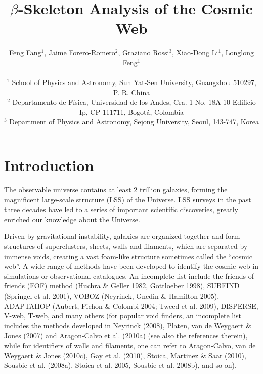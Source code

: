 \documentclass[useAMS,usenatbib]{mnras}
\begin{document}
\title[$\beta$-Skeleton Analysis]{$\beta$-Skeleton Analysis of the Cosmic Web}

\author[Fang, Forero-Romero, Rossi, Li \& Feng (2018)]
{Feng Fang$^1$, Jaime Forero-Romero$^2$, Graziano Rossi$^3$, Xiao-Dong Li$^1$, Longlong Feng$^1$ \\ \\
$^1$ School of Physics and Astronomy, Sun Yat-Sen University, Guangzhou 510297, P. R. China \\
$^2$ Departamento de F{\'i}sica, Universidad de los Andes, Cra. 1 No. 18A-10 Edificio Ip, CP 111711, Bogot{\'a}, Colombia \\
$^3$ Department of Physics and Astronomy, Sejong University, Seoul, 143-747, Korea}

\pagerange{\pageref{firstpage}--\pageref{lastpage}} 
\maketitle
\label{firstpage}


 

\section{Introduction}

The observable universe contains at least 2 trillion galaxies, 
forming the magnificent large-scale structure (LSS) of the Universe. 
LSS surveys in the past three decades have led to a series of important scientific discoveries, 
greatly enriched our knowledge about the Universe.

Driven by gravitational instability, galaxies are organized together and form structures of superclusters, 
sheets, walls and filaments, which are separated by immense voids, 
creating a vast foam-like structure sometimes called the ``cosmic web''. 
A wide range of methods have been developed to identify the cosmic web in simulations or observational catalogues. 
An incomplete list include the friends-of-friends (FOF) method (Huchra \& Geller 1982, Gottloeber 1998), 
SUBFIND (Springel et al. 2001), VOBOZ (Neyrinck, Gnedin \& Hamilton 2005), 
ADAPTAHOP (Aubert, Pichon \& Colombi 2004; Tweed et al. 2009), 
DISPERSE, V-web, T-web, 
and many others 
(for popular void finders, an incomplete list includes the methods developed in Neyrinck (2008), Platen, van de Weygaert \& Jones (2007) 
and Aragon-Calvo et al. (2010a) (see also the references therein), 
while for identifiers of walls and filaments, one can refer to Aragon-Calvo, van de Weygaert \& Jones (2010c), 
Gay et al. (2010), Stoica, Martinez \& Saar (2010), Sousbie et al. (2008a), Stoica et al. 2005, Sousbie et al. 2008b), and so on).
\end{document}

